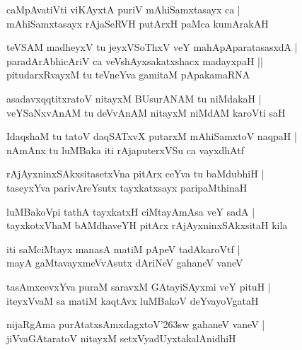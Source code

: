 \documentclass[twoside,12pt,openright]{book}
\def\S{\char'263}
\newcounter{shloka}[chapter]
\begin{document}
\begin{shloka}%
caMpAvatiVti viKAyxtA puriV mAhiSamxtasayx ca |\\
mAhiSamxtasayx rAjaSeRVH putArxH paMca kumArakAH 
\end{shloka}

\begin{shloka}%
teVSAM madheyxV tu jeyxVSoThxV veY mahApAparatasasxdA |\\
paradArAbhicAriV ca veVshAyxsakatxshacx madayxpaH ||\\
pitudarxRvayxM tu teVneYva gamitaM pApakamaRNA
\end{shloka}

\begin{shloka}%
asadavxqqtitxratoV nitayxM BUsurANAM tu niMdakaH |\\
veYSaNxvAnAM tu deVvAnAM nitayxM niMdAM karoVti saH 
\end{shloka}

\begin{shloka}%
IdaqshaM tu tatoV daqSATxvX putarxM mAhiSamxtoV naqpaH |\\
nAmAnx tu luMBaka iti rAjaputerxVSu ca vayxdhAtf
\end{shloka}

\begin{shloka}%
rAjAyxninxSAkxsitasetxVna pitArx ceYva tu baMdubhiH |\\
taseyxYva parivAreYsutx tayxkatxsayx paripaMthinaH
\end{shloka}

\begin{shloka}%
luMBakoVpi tathA tayxkatxH ciMtayAmAsa veY sadA |\\
tayxkotxVhaM bAMdhaveYH pitArx rAjAyxninxSAkxsitaH kila
\end{shloka}

\begin{shloka}%
iti saMciMtayx manasA matiM pApeV tadAkaroVtf |\\
mayA gaMtavayxmeVvAsutx dAriNeV gahaneV  vaneV 
\end{shloka}

\begin{shloka}%
tasAmxcevxYva  puraM saravxM GAtayiSAyxmi veY pituH |\\
iteyxVvaM sa matiM kaqtAvx luMBakoV deYvayoVgataH
\end{shloka}

\begin{shloka}%
nijaRgAma purAtatxsAmxdagxtoV\S sw gahaneV vaneV |\\
jiVvaGAtaratoV nitayxM setxVyadUyxtakalAnidhiH 
\end{shloka}
\end{document}

